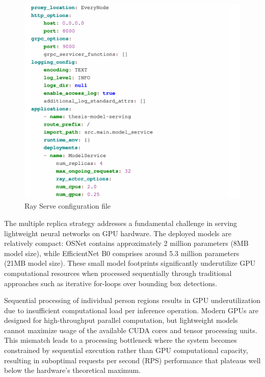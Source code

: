 \newpage

\begin{figure}[htbp]
    \centering
    \includegraphics[width=1\textwidth]{Figure/rayserve_conf.png}
    \caption{Ray Serve configuration file}
    \label{fig:ray_serve_config}
\end{figure}

The multiple replica strategy addresses a fundamental challenge in serving lightweight neural networks on GPU hardware. The deployed models are relatively compact: OSNet contains approximately 2 million parameters (8MB model size), while EfficientNet B0 comprises around 5.3 million parameters (21MB model size). These small model footprints significantly underutilize GPU computational resources when processed sequentially through traditional approaches such as iterative for-loops over bounding box detections.

Sequential processing of individual person regions results in GPU underutilization due to insufficient computational load per inference operation. Modern GPUs are designed for high-throughput parallel computation, but lightweight models cannot maximize usage of the available CUDA cores and tensor processing units. This mismatch leads to a processing bottleneck where the system becomes constrained by sequential execution rather than GPU computational capacity, resulting in suboptimal requests per second (RPS) performance that plateaus well below the hardware's theoretical maximum.

